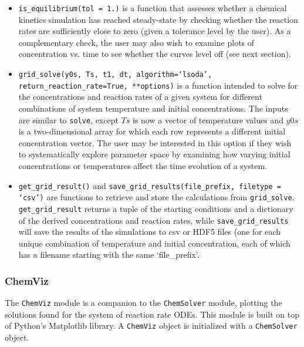 \documentclass[12pt]{article}
\begin{document}
\begin{itemize}
\item \texttt{is\_equilibrium(tol = 1.)} is a function that assesses whether a chemical kinetics simulation has reached steady-state by checking whether the reaction rates are sufficiently close to zero (given a tolerance level by the user). As a complementary check, the user may also wish to examine plots of concentration vs. time to see whether the curves level off (see next section). 
\item \texttt{grid\_solve(y0s, Ts, t1, dt, algorithm=`lsoda', return\_reaction\_rate=True, **options)} is a function intended to solve for the concentrations and reaction rates of a given system for different combinations of system temperature and initial concentrations. The inputs are similar to \texttt{solve}, except $Ts$ is now a vector of temperature values and $y0s$ is a two-dimensional array for which each row represents a different initial concentration vector. The user may be interested in this option if they wish to systematically explore parameter space by examining how varying initial concentrations or temperatures affect the time evolution of a system. 
\item \texttt{get\_grid\_result()} and \texttt{save\_grid\_results(file\_prefix, filetype = `csv')} are functions to retrieve and store the calculations from \texttt{grid\_solve}. \texttt{get\_grid\_result} returns a tuple of the starting conditions and a dictionary of the derived concentrations and reaction rates, while \texttt{save\_grid\_results} will save the results of the simulations to csv or HDF5 files (one for each unique combination of temperature and initial concentration, each of which has a filename starting with the same `file\_prefix'. 
\end{itemize}

\subsubsection{ChemViz}
The \texttt{ChemViz} module is a companion to the \texttt{ChemSolver} module, plotting the solutions found for the system of reaction rate ODEs. This module is built on top of Python's Matplotlib library. A \texttt{ChemViz} object is initialized with a \texttt{ChemSolver} object. 
\end{document}
